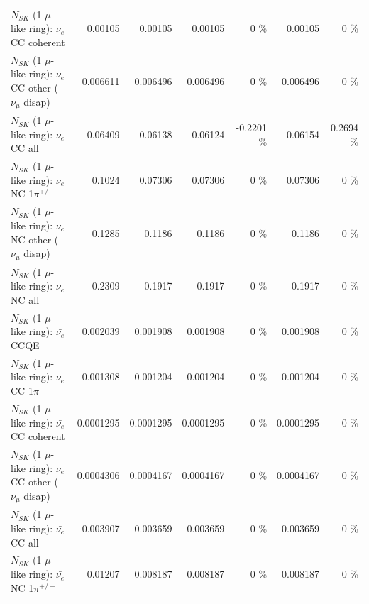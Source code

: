 \begin{table}
\begin{tabular}{| l | r | r | r  r | r  r |}
                               $N_{SK}$ (1 $\mu$-like ring): $\nu_e$ CC coherent &         0.00105 &         0.00105 &         0.00105 &        0 \%  &         0.00105 &        0 \%  \\ 
                $N_{SK}$ (1 $\mu$-like ring): $\nu_e$ CC other ($\nu_\mu$ disap) &        0.006611 &        0.006496 &        0.006496 &        0 \%  &        0.006496 &        0 \%  \\ 
                                  $N_{SK}$ (1 $\mu$-like ring): $\nu_{e}$ CC all &         0.06409 &         0.06138 &         0.06124 &  -0.2201 \%  &         0.06154 &   0.2694 \%  \\ 
\hline
                           $N_{SK}$ (1 $\mu$-like ring): $\nu_e$ NC 1$\pi^{+/-}$ &          0.1024 &         0.07306 &         0.07306 &        0 \%  &         0.07306 &        0 \%  \\ 
                $N_{SK}$ (1 $\mu$-like ring): $\nu_e$ NC other ($\nu_\mu$ disap) &          0.1285 &          0.1186 &          0.1186 &        0 \%  &          0.1186 &        0 \%  \\ 
                                  $N_{SK}$ (1 $\mu$-like ring): $\nu_{e}$ NC all &          0.2309 &          0.1917 &          0.1917 &        0 \%  &          0.1917 &        0 \%  \\ 
\hline
\hline
\hline
                                $N_{SK}$ (1 $\mu$-like ring): $\bar{\nu_e}$ CCQE &        0.002039 &        0.001908 &        0.001908 &        0 \%  &        0.001908 &        0 \%  \\ 
                           $N_{SK}$ (1 $\mu$-like ring): $\bar{\nu_e}$ CC 1$\pi$ &        0.001308 &        0.001204 &        0.001204 &        0 \%  &        0.001204 &        0 \%  \\ 
                         $N_{SK}$ (1 $\mu$-like ring): $\bar{\nu_e}$ CC coherent &       0.0001295 &       0.0001295 &       0.0001295 &        0 \%  &       0.0001295 &        0 \%  \\ 
          $N_{SK}$ (1 $\mu$-like ring): $\bar{\nu_e}$ CC other ($\nu_\mu$ disap) &       0.0004306 &       0.0004167 &       0.0004167 &        0 \%  &       0.0004167 &        0 \%  \\ 
                            $N_{SK}$ (1 $\mu$-like ring): $\bar{\nu_{e}}$ CC all &        0.003907 &        0.003659 &        0.003659 &        0 \%  &        0.003659 &        0 \%  \\ 
\hline
                     $N_{SK}$ (1 $\mu$-like ring): $\bar{\nu_e}$ NC 1$\pi^{+/-}$ &         0.01207 &        0.008187 &        0.008187 &        0 \%  &        0.008187 &        0 \%  \\ 

\end{tabular}
\end{table}
